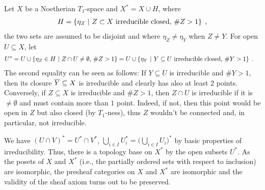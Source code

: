 \documentclass[a4paper,parskip=half,numbers=enddot, DIV=12]{scrreprt}
\begin{document}
Let $X$ be a Noetherian $T_1$-space and $X^* = X\cup H $, where 
\begin{align*}
    H= \left\{\eta_Z\ \middle|\  Z\subset X \text{ irreducible closed, }\#Z> 1\right\}\;,
\end{align*}
the two sets are assumed to be disjoint and where $\eta_Z\neq \eta_Y$ when $Z\neq Y$. For open $U\subseteq X$, let 
\begin{align*}
    U^* &= U \cup \left\{\eta_Z\in H\ \middle|\  Z\cap U \neq \emptyset\text{, }\# Z > 1\right\} = U\cup \left\{\eta_Y \ \middle|\  Y\subseteq U\text{ irreducible closed, }\#Y > 1\right\}\;.
\end{align*}
The second equality can be seen as follows: If $Y\subseteq U$ is irreducible and $\#Y>1$, then its closure $\overline Y\subseteq X$ is irreducible and clearly has also at least $2$ points. Conversely, if $Z\subseteq X$ is irreducible and $\# Z>1$, then $Z\cap U$ is irreducible if it is $\neq\emptyset$ and must contain more than $1$ point. Indeed, if not, then this point would be open in $Z$ but also closed (by $T_1$-ness), thus $Z$ wouldn't be connected and, in particular, not irreducible.

We have $(U\cap V)^* = U^* \cap V^*$, $\bigcup_{i\in I} U_i^* = \big(\bigcup_{i\in I} U_i\big)^*$ by basic properties of irreducibility. Thus, there is a topology base on $X^*$ by the open subsets $U^*$. As the posets of $X$ and $X^*$ (i.e., the partially ordered sets with respect to inclusion) are isomorphic, the presheaf categories on $X$ and $X^*$ are isomorphic and the validity of the sheaf axiom turns out to be preserved. 
\end{document}
